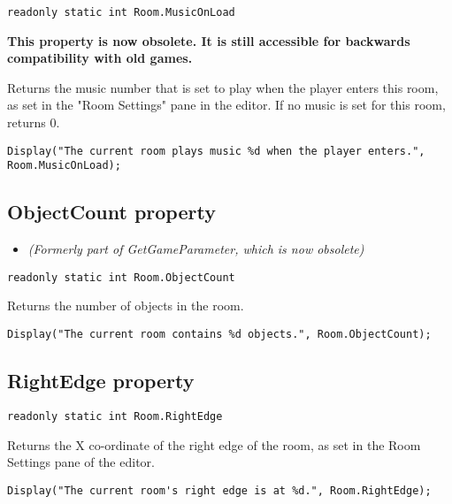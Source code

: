 \begin{verbatim}
readonly static int Room.MusicOnLoad
\end{verbatim}
\bf{This property is now obsolete.} It is still accessible for backwards compatibility
with old games.

Returns the music number that is set to play when the player enters this room, as
set in the "Room Settings" pane in the editor. If no music is set for this room,
returns 0.

\begin{verbatim}
Display("The current room plays music %d when the player enters.", Room.MusicOnLoad);
\end{verbatim}


\subsection{ObjectCount property}\label{Room.ObjectCount}%

\begin{itemize}
\item \it{(Formerly part of GetGameParameter, which is now obsolete)}
\end{itemize}

\begin{verbatim}
readonly static int Room.ObjectCount
\end{verbatim}
Returns the number of objects in the room.

\begin{verbatim}
Display("The current room contains %d objects.", Room.ObjectCount);
\end{verbatim}


\subsection{RightEdge property}\label{Room.RightEdge}%

\begin{verbatim}
readonly static int Room.RightEdge
\end{verbatim}
Returns the X co-ordinate of the right edge of the room, as set in the Room Settings
pane of the editor.

\begin{verbatim}
Display("The current room's right edge is at %d.", Room.RightEdge);
\end{verbatim}

